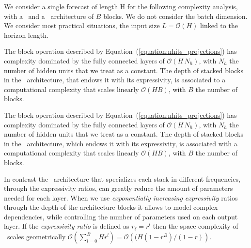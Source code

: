 We consider a single forecast of length H for the following complexity analysis, with a \NBEATS\ and a \ours\ architecture of $B$ blocks. We do not consider the batch dimension. We consider most practical situations, the input size $L=\mathcal{O}(H)$ linked to the horizon length.

The block operation described by Equation~(\ref{equation:nhits_projections}) has complexity dominated by the fully connected layers of $\mathcal{O}(H\,N_{h})$, with $N_{h}$ the number of hidden units that we treat as a constant. The depth of stacked blocks in the \NBEATSg\ architecture, that endows it with its expressivity, is associated to a computational complexity that scales linearly $\mathcal{O}(H B)$, with $B$ the number of blocks.

The block operation described by Equation~(\ref{equation:nhits_projections}) has complexity dominated by the fully connected layers of $\mathcal{O}(H\,N_{h})$, with $N_{h}$ the number of hidden units that we treat as a constant. The depth of stacked blocks in the \NBEATSg\ architecture, which endows it with its expressivity, is associated with a computational complexity that scales linearly $\mathcal{O}(H B)$, with $B$ the number of blocks.

In contrast the \ours\ architecture that specializes each stack in different frequencies, through the expressivity ratios, can greatly reduce the amount of parameters needed for each layer. When we use \emph{exponentially increasing expressivity} ratios through the depth of the architecture blocks it allows to model complex dependencies, while controlling the number of parameters used on each output layer. If the \emph{expressivity ratio} is defined as $r_{\ell} = r^{l}$ then the space complexity of \ours\ scales geometrically $\mathcal{O}(\sum^{B}_{l=0} H r^{l}) =\mathcal{O}\left((H(1-r^{B})/(1-r)\right)$.

